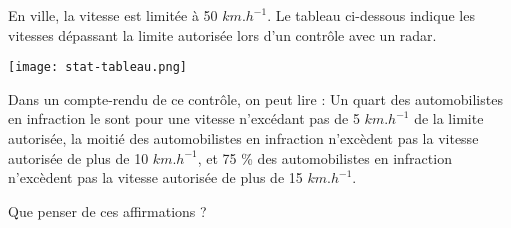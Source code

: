 
En ville, la vitesse est limitée à 50 $km.h^{-1}$. Le tableau ci-dessous indique les vitesses dépassant la limite autorisée lors d’un contrôle avec un radar.

\texttt{[image: stat-tableau.png]} 

Dans un compte-rendu de ce contrôle, on peut lire : Un quart des automobilistes en infraction le sont pour une vitesse n'excédant pas de 5 $km.h^{-1}$ de la limite autorisée, la moitié des automobilistes en infraction n'excèdent pas la vitesse autorisée de plus de 10 $km.h^{-1}$, et 75 \% des automobilistes en infraction n'excèdent pas la vitesse autorisée de plus de 15 $km.h^{-1}$.

Que penser de ces affirmations ?